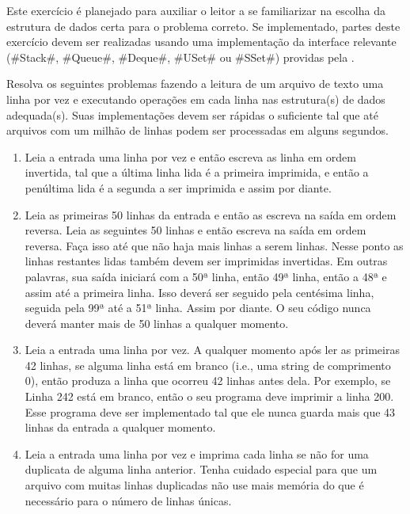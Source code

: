 \begin{exc}
  Este exercício é planejado para auxiliar o leitor a se familiarizar na escolha da estrutura de dados certa para o problema correto. Se implementado, partes deste exercício devem ser realizadas usando uma implementação da interface relevante
  (#Stack#, #Queue#, #Deque#, #USet# ou #SSet#)
  providas pela .

  Resolva os seguintes problemas fazendo a leitura de um arquivo de texto uma linha por vez e executando operações em cada linha nas estrutura(s) de dados adequada(s).
Suas implementações devem ser rápidas o suficiente tal que até arquivos com um milhão de linhas podem ser processadas em alguns segundos.
  \begin{enumerate}
    \item Leia a entrada uma linha por vez e então escreva as linha em ordem invertida, tal que a última linha lida é a primeira imprimida, e então a penúltima lida é a segunda a ser imprimida e assim por diante. 
    \item Leia as primeiras 50 linhas da entrada e então as escreva na saída em ordem reversa. Leia as seguintes 50 linhas e então escreva na saída em ordem reversa. Faça isso até que não haja mais linhas a serem linhas. Nesse ponto as linhas restantes lidas também devem ser imprimidas invertidas.
Em outras palavras, sua saída iniciará com a 50ª linha, então 49ª linha, então a 48ª e assim até a primeira linha. Isso deverá ser seguido pela centésima linha, seguida pela 99ª até a 51ª linha. Assim por diante.
O seu código nunca deverá manter mais de 50 linhas a qualquer momento.

\item Leia a entrada uma linha por vez.
  A qualquer momento após ler as primeiras 42 linhas, se alguma linha está em branco (i.e., uma string de comprimento 0), então produza a linha que ocorreu 42 linhas antes dela. Por exemplo, se Linha 242 está em branco, então o seu programa deve imprimir a linha 200. Esse programa deve ser implementado tal que ele nunca guarda mais que 43 linhas da entrada a qualquer momento.

\item Leia a entrada uma linha por vez e imprima cada linha se não for uma duplicata de alguma linha anterior. Tenha cuidado especial para que um arquivo com muitas linhas duplicadas não use mais memória do que é necessário para o número de linhas únicas.


\end{enumerate}
\end{exc}
